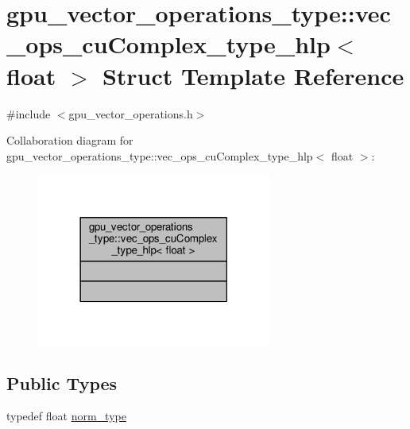 \hypertarget{structgpu__vector__operations__type_1_1vec__ops__cuComplex__type__hlp_3_01float_01_4}{\section{gpu\-\_\-vector\-\_\-operations\-\_\-type\-:\-:vec\-\_\-ops\-\_\-cu\-Complex\-\_\-type\-\_\-hlp$<$ float $>$ Struct Template Reference}
\label{structgpu__vector__operations__type_1_1vec__ops__cuComplex__type__hlp_3_01float_01_4}
}


{\ttfamily \#include $<$gpu\-\_\-vector\-\_\-operations.\-h$>$}



Collaboration diagram for gpu\-\_\-vector\-\_\-operations\-\_\-type\-:\-:vec\-\_\-ops\-\_\-cu\-Complex\-\_\-type\-\_\-hlp$<$ float $>$\-:
\nopagebreak
\begin{figure}[H]
\begin{center}
\leavevmode
\includegraphics[width=218pt]{structgpu__vector__operations__type_1_1vec__ops__cuComplex__type__hlp_3_01float_01_4__coll__graph}
\end{center}
\end{figure}
\subsection*{Public Types}
\begin{DoxyCompactItemize}
\item 
typedef float \hyperlink{structgpu__vector__operations__type_1_1vec__ops__cuComplex__type__hlp_3_01float_01_4_a51d3eb3785dffab72135d13e1cbeff4d}{norm\-\_\-type}
\end{DoxyCompactItemize}


